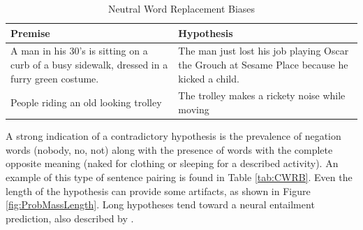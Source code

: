 \documentclass[11pt]{article}
\begin{document}
\begin{table}[ht!]
    \centering
    \begin{tabularx}{0.45\textwidth} { 
  | >{\raggedright\arraybackslash}X 
  | >{\raggedright\arraybackslash}X | }
    \hline
    Premise & Hypothesis \\
    \hline\hline
        A man in his 30's is sitting on a curb of a busy sidewalk, dressed in a furry green costume. & The man just lost his job playing Oscar the Grouch at Sesame Place because he kicked a child. \\
        \hline
       People riding an old looking trolley & The trolley makes a rickety noise while moving \\
        \hline
    \end{tabularx}
    \caption{Neutral Word Replacement Biases}
    \label{tab:NWRB}
\end{table}
A strong indication of a contradictory hypothesis is the prevalence of negation words (nobody, no, not) along with the presence of words with the complete opposite meaning (naked for clothing or sleeping for a described activity). An example of this type of sentence pairing is found in Table \ref{tab:CWRB}. Even the length of the hypothesis can provide some artifacts, as shown in Figure \ref{fig:ProbMassLength}. Long hypotheses tend toward a neural entailment prediction, also described by \citealp{princeton}. 
\end{document}

